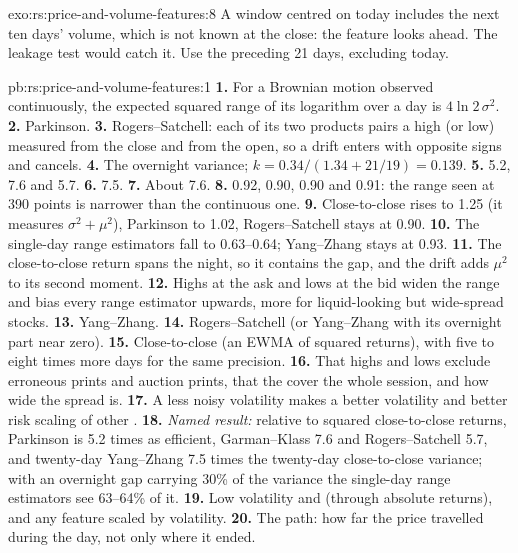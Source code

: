\begin{solution}{exo:rs:price-and-volume-features:8}
A window centred on today includes the next ten days' volume, which is not known at the close: the feature looks ahead. The leakage
test would catch it. Use the preceding 21 days, excluding today.
\end{solution}

\begin{solution}{pb:rs:price-and-volume-features:1}
\textbf{1.} For a Brownian motion observed continuously, the expected squared range of its logarithm over a day is $4\ln2\,\sigma^2$.
\textbf{2.} Parkinson. \textbf{3.} Rogers--Satchell: each of its two products pairs a high (or low) measured from the close and from
the open, so a drift enters with opposite signs and cancels. \textbf{4.} The overnight variance; $k = 0.34/(1.34 + 21/19) = 0.139$.
\textbf{5.} 5.2, 7.6 and 5.7. \textbf{6.} 7.5. \textbf{7.} About 7.6. \textbf{8.} 0.92, 0.90, 0.90 and 0.91: the range seen at 390
points is narrower than the continuous one. \textbf{9.} Close-to-close rises to 1.25 (it measures $\sigma^2 + \mu^2$), Parkinson to
1.02, Rogers--Satchell stays at 0.90. \textbf{10.} The single-day range estimators fall to 0.63--0.64; Yang--Zhang stays at 0.93.
\textbf{11.} The close-to-close return spans the night, so it contains the gap, and the drift adds $\mu^2$ to its second moment.
\textbf{12.} Highs at the ask and lows at the bid widen the range and bias every range estimator upwards, more for liquid-looking but
wide-spread stocks. \textbf{13.} Yang--Zhang. \textbf{14.} Rogers--Satchell (or Yang--Zhang with its overnight part near zero).
\textbf{15.} Close-to-close (an EWMA of squared returns), with five to eight times more days for the same precision. \textbf{16.} That
highs and lows exclude erroneous prints and auction prints, that the  cover the whole session, and how wide the spread is.
\textbf{17.} A less noisy volatility makes a better volatility  and better risk scaling of other . \textbf{18.}
\emph{Named result:} relative to squared close-to-close returns, Parkinson is 5.2 times as efficient, Garman--Klass 7.6 and
Rogers--Satchell 5.7, and twenty-day Yang--Zhang 7.5 times the twenty-day close-to-close variance; with an overnight gap carrying 30\%
of the variance the single-day range estimators see 63--64\% of it. \textbf{19.} Low volatility and  (through absolute
returns), and any feature scaled by volatility. \textbf{20.} The path: how far the price travelled during the day, not only where it
ended.
\end{solution}

